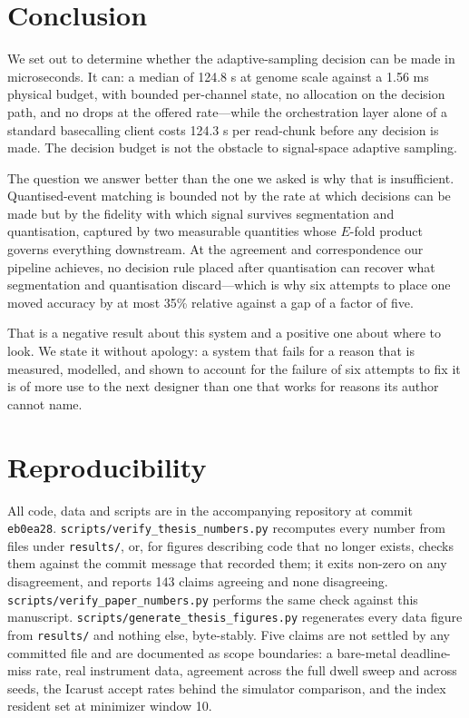 \documentclass[conference]{IEEEtran}
\begin{document}
\section{Conclusion}

We set out to determine whether the adaptive-sampling decision can be made in microseconds. It
can: a median of 124.8 \textmu{}s at genome scale against a 1.56 ms physical budget, with bounded
per-channel state, no allocation on the decision path, and no drops at the offered rate---while
the orchestration layer alone of a standard basecalling client costs 124.3 \textmu{}s per read-chunk
before any decision is made. The decision budget is not the obstacle to signal-space adaptive
sampling.

The question we answer better than the one we asked is why that is insufficient. Quantised-event
matching is bounded not by the rate at which decisions can be made but by the fidelity with which
signal survives segmentation and quantisation, captured by two measurable quantities whose
$E$-fold product governs everything downstream. At the agreement and correspondence our pipeline
achieves, no decision rule placed after quantisation can recover what segmentation and
quantisation discard---which is why six attempts to place one moved accuracy by at most 35\%
relative against a gap of a factor of five.

That is a negative result about this system and a positive one about where to look. We state it
without apology: a system that fails for a reason that is measured, modelled, and shown to
account for the failure of six attempts to fix it is of more use to the next designer than one
that works for reasons its author cannot name.

\section*{Reproducibility}

All code, data and scripts are in the accompanying repository at commit \texttt{eb0ea28}.
\texttt{scripts/verify\_thesis\_numbers.py} recomputes every number from files under
\texttt{results/}, or, for figures describing code that no longer exists, checks them against the
commit message that recorded them; it exits non-zero on any disagreement, and reports 143 claims
agreeing and none disagreeing. \texttt{scripts/verify\_paper\_numbers.py} performs the same check
against this manuscript. \texttt{scripts/generate\_thesis\_figures.py} regenerates every data
figure from \texttt{results/} and nothing else, byte-stably. Five claims are not settled by any
committed file and are documented as scope boundaries: a bare-metal deadline-miss rate, real
instrument data, agreement across the full dwell sweep and across seeds, the Icarust accept rates
behind the simulator comparison, and the index resident set at minimizer window 10.
\end{document}

